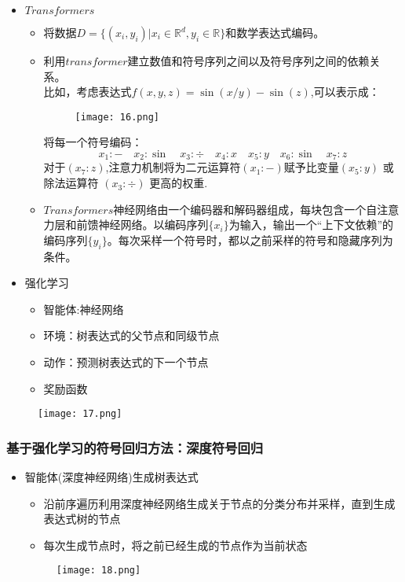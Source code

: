 \documentclass[CJK,aspectratio=169]{beamer}  %
\begin{document}
	\begin{frame}
		\begin{itemize}
			\item $Transformers$
			\begin{itemize}
				\item 将数据$D=\{(x_i,y_i)|x_i\in \mathbb{R}^d,y_i\in \mathbb{R}\}$和数学表达式编码。
				\item 利用$transformer$建立数值和符号序列之间以及符号序列之间的依赖关系。
				\\比如，考虑表达式$f(x,y,z)=\sin(x/y)-\sin(z)$,可以表示成：
				\begin{figure}
					\centering
					\texttt{[image: 16.png]}
				\end{figure}
				将每一个符号编码：
				$$x_1:-\quad x_2:\sin \quad x_3:\div \quad x_4:x \quad x_5:y \quad x_6:\sin \quad x_7:z$$
				对于$(x_7:z)$,注意力机制将为二元运算符$(x_1 : −)$赋予比变量$(x_5 : y)$ 或除法运算符 $(x_3 : \div)$ 更高的权重.
				\item $Transformers$神经网络由一个编码器和解码器组成，每块包含一个自注意力层和前馈神经网络。以编码序列$\{x_i\}$为输入，输出一个“上下文依赖”的编码序列$\{y_i\}$。每次采样一个符号时，都以之前采样的符号和隐藏序列为条件。
			\end{itemize}
		\end{itemize}
	\end{frame}
	\begin{frame}
		\begin{itemize}
			\item 强化学习
			\begin{itemize}
				\item 智能体:神经网络
				\item 环境：树表达式的父节点和同级节点
				\item 动作：预测树表达式的下一个节点
				\item 奖励函数
			\end{itemize}
		\end{itemize}
		\begin{figure}
			\centering 
			\texttt{[image: 17.png]}
			
		\end{figure}
	\end{frame}
	\begin{frame}
		\frametitle{基于强化学习的符号回归方法：深度符号回归}
		\begin{itemize}
			\item 智能体(深度神经网络)生成树表达式
			\begin{itemize}
				\item 沿前序遍历利用深度神经网络生成关于节点的分类分布并采样，直到生成表达式树的节点
				\item 每次生成节点时，将之前已经生成的节点作为当前状态
			\end{itemize}
			\begin{figure}
				\centering 
				\texttt{[image: 18.png]}
			\end{figure}
		\end{itemize}
	\end{frame}
\end{document}
